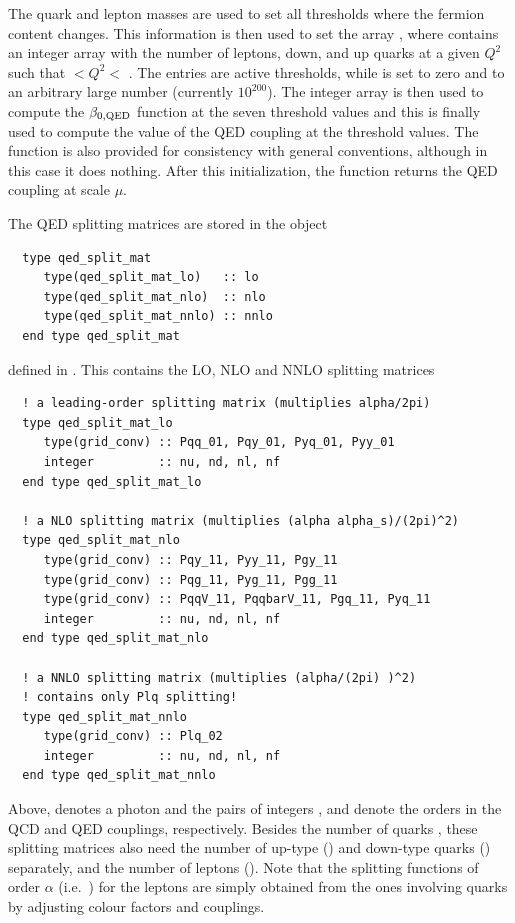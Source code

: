 The quark and lepton masses are used to set all thresholds where the
fermion content changes. This information is then used to set
the array , where 
contains an integer array with the number of leptons, down, and up
quarks at a given $Q^2$ such that $<Q^2<$
.
%
The  entries are active thresholds, while
 is set to zero and  to an
arbitrary large number (currently $10^{200}$).
%
The integer array
 is then used to compute the
$\beta_{0,\rm QED}$ function  at the
seven threshold values and this is finally used to compute the value
of the QED coupling  at the
threshold values.
%
The function  is also provided for
consistency with general \hoppet conventions, although in this case it does nothing.
%
After this initialization, the function  returns the QED coupling at
scale $\mu$.


The QED splitting matrices are stored in the object

\begin{lstlisting}
  type qed_split_mat
     type(qed_split_mat_lo)   :: lo
     type(qed_split_mat_nlo)  :: nlo
     type(qed_split_mat_nnlo) :: nnlo
  end type qed_split_mat
\end{lstlisting}
defined in . 
This contains the LO, NLO and NNLO splitting matrices 
\begin{lstlisting}
  ! a leading-order splitting matrix (multiplies alpha/2pi)
  type qed_split_mat_lo
     type(grid_conv) :: Pqq_01, Pqy_01, Pyq_01, Pyy_01
     integer         :: nu, nd, nl, nf
  end type qed_split_mat_lo

  ! a NLO splitting matrix (multiplies (alpha alpha_s)/(2pi)^2)
  type qed_split_mat_nlo
     type(grid_conv) :: Pqy_11, Pyy_11, Pgy_11
     type(grid_conv) :: Pqg_11, Pyg_11, Pgg_11
     type(grid_conv) :: PqqV_11, PqqbarV_11, Pgq_11, Pyq_11
     integer         :: nu, nd, nl, nf
  end type qed_split_mat_nlo

  ! a NNLO splitting matrix (multiplies (alpha/(2pi) )^2) 
  ! contains only Plq splitting!
  type qed_split_mat_nnlo 
     type(grid_conv) :: Plq_02
     integer         :: nu, nd, nl, nf
  end type qed_split_mat_nnlo
\end{lstlisting}     
%
Above,  denotes a photon and the pairs of integers ,
 and  denote the orders in the QCD and QED couplings,
respectively. Besides the number of quarks , these splitting
matrices also need the number of up-type () and down-type
quarks () separately, and the number of leptons ().
%
Note that the splitting functions of order $\alpha$ (i.e.\ )
for the leptons are simply obtained from the ones
involving quarks by adjusting colour factors and couplings.

